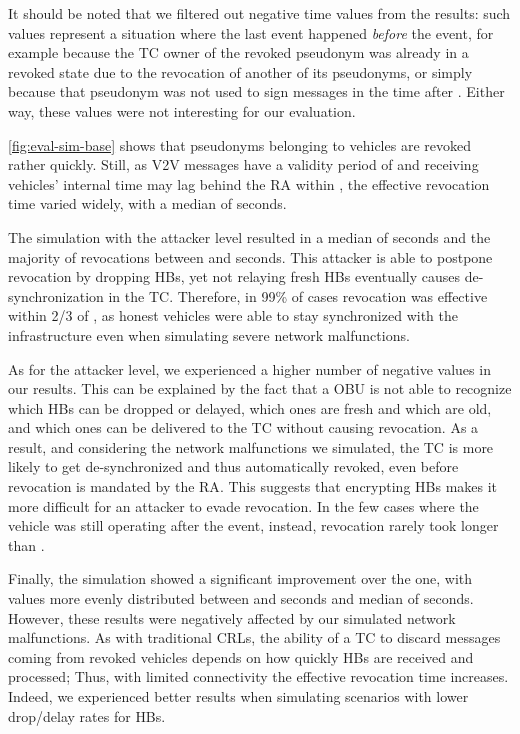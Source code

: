 It should be noted that we filtered out negative time values from the results:
such values represent a situation where the last \funcverify{} event happened
\emph{before} the \funcrevokedaa{} event, for example because the \ac{TC} owner
of the revoked pseudonym was already in a revoked state due to the revocation of
another of its pseudonyms, or simply because that pseudonym was not used to sign
messages in the time after \funcrevokedaa{}. Either way, these values were not
interesting for our evaluation.%

\cref{fig:eval-sim-base} shows that pseudonyms belonging to \attackerhonest{}
vehicles are revoked rather quickly. Still, as \ac{V2V} messages have a validity
period of \paramtt{} and receiving vehicles' internal time may lag behind the RA
within \paramtt{}, the effective revocation time varied widely, with a median of
\simhonestmedian{} seconds.

The simulation with the \attackersmart{} attacker level resulted in a median of
\simsmartmedian{} seconds and the majority of revocations between \simsmartmin{}
and \simsmartmax{} seconds. %
This attacker is able to
postpone revocation by dropping \acp{HB}, yet %
not relaying
fresh \acp{HB} eventually causes de-synchronization in the \ac{TC}. Therefore,
in 99\% of cases revocation was effective within 2/3 of \paramteff{},
as honest vehicles were able to stay synchronized with the infrastructure
even when simulating severe network malfunctions.

As for the \attackerblind{} attacker level, we experienced a higher number of
negative values in our results. This can be explained by the fact that a
\attackerblind{} \ac{OBU} is not able to recognize which \acp{HB} can be dropped
or delayed, which ones are fresh and which are old, and which ones can be
delivered to the \ac{TC} without causing revocation. As a result, and
considering the network malfunctions we simulated, the \ac{TC} is more likely to
get de-synchronized and thus automatically revoked, even before revocation is
mandated by the \ac{RA}. This suggests that encrypting \acp{HB} makes it more
difficult for an attacker to evade revocation. In the few cases where the
vehicle was still operating after the \funcrevokedaa{} event, instead,
revocation rarely took longer than \paramtt{}.%

Finally, the \attackersmartprl{} simulation showed a significant improvement
over the \attackersmart{} one, with values more evenly distributed between
\simsmartprlmin{} and \simsmartprlmax{} seconds and median of
\simsmartprlmedian{} seconds. However, these results were negatively affected by
our simulated network malfunctions. As with traditional \acp{CRL}, the ability
of a \ac{TC} to discard messages coming from revoked vehicles depends on how
quickly \acp{HB} are received and processed; Thus, with limited connectivity the
effective revocation time increases. Indeed, we experienced better results when
simulating scenarios with lower drop/delay rates for \acp{HB}.

